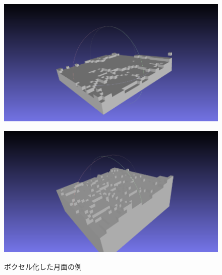 \begin{figure}[htbp]
\begin{minipage}[b]{0.49\linewidth}
    \label{fig:voxel6}
    \end{minipage}
    \begin{minipage}[b]{0.49\linewidth}
    \centering
    \includegraphics[keepaspectratio, scale=0.45]{images/voxel7.png}
    \label{fig:voxel7}
    \end{minipage}
    \begin{minipage}[b]{0.49\linewidth}
    \centering
    \includegraphics[keepaspectratio, scale=0.45]{images/voxel8.png}
    \label{fig:voxel8}
    \end{minipage}
    \caption{ボクセル化した月面の例}\label{fig:voxel_moons}
  \end{figure}

